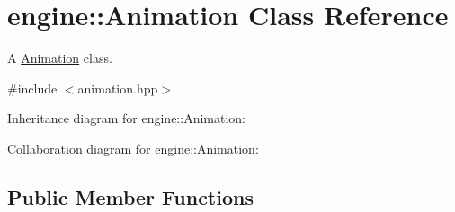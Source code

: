 \hypertarget{classengine_1_1_animation}{}\section{engine\+:\+:Animation Class Reference}
\label{classengine_1_1_animation}


A \hyperlink{classengine_1_1_animation}{Animation} class.  




{\ttfamily \#include $<$animation.\+hpp$>$}



Inheritance diagram for engine\+:\+:Animation\+:


Collaboration diagram for engine\+:\+:Animation\+:
\subsection*{Public Member Functions}
